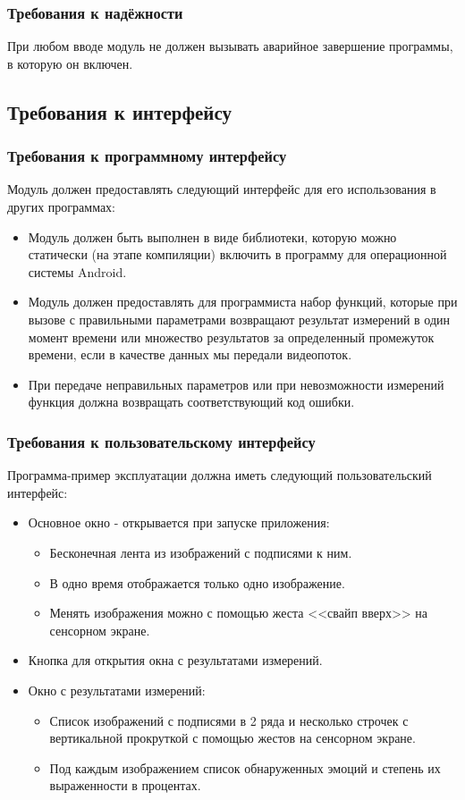 \documentclass[a4paper,12pt,reqno]{article}
\begin{document}
    \subsubsection{Требования к надёжности}
    При любом вводе модуль не должен вызывать аварийное завершение программы, в которую он включен.

    \subsection{Требования к интерфейсу}
    \subsubsection{Требования к программному интерфейсу}
    Модуль должен предоставлять следующий интерфейс для его использования в других программах:
    \begin{itemize}
        \item Модуль должен быть выполнен в виде библиотеки, которую можно статически (на этапе компиляции) включить в программу для операционной системы Android.
        \item Модуль должен предоставлять для программиста набор функций, которые при вызове с правильными параметрами возвращают результат измерений в один момент времени или множество результатов за определенный промежуток времени, если в качестве данных мы передали видеопоток.
        \item При передаче неправильных параметров или при невозможности измерений функция должна возвращать соответствующий код ошибки.
    \end{itemize}
    \subsubsection{Требования к пользовательскому интерфейсу}
    Программа-пример эксплуатации должна иметь следующий пользовательский интерфейс:
    \begin{itemize}
        \item Основное окно - открывается при запуске приложения:
        \begin{itemize}
            \item Бесконечная лента из изображений с подписями к ним.
            \item В одно время отображается только одно изображение.
            \item Менять изображения можно с помощью жеста <<свайп вверх>> на сенсорном экране.
        \end{itemize}
        \item Кнопка для открытия окна с результатами измерений.
        \item Окно с результатами измерений:
        \begin{itemize}
            \item Список изображений с подписями в 2 ряда и несколько строчек с вертикальной прокруткой с помощью жестов на сенсорном экране.
            \item Под каждым изображением список обнаруженных эмоций и степень их выраженности в процентах.
        \end{itemize}
    \end{itemize}
\end{document}

